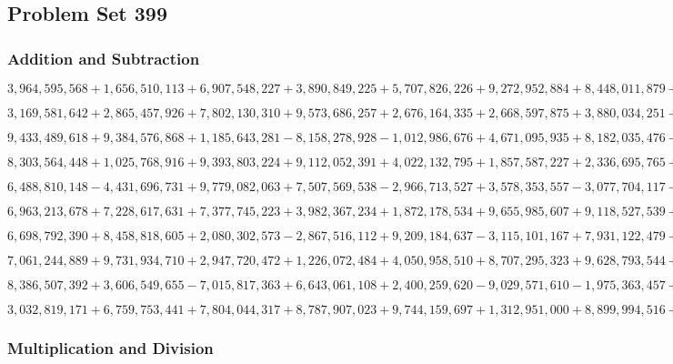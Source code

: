 \hypertarget{problem-set-399}{%
\subsection{Problem Set 399}\label{problem-set-399}}

\hypertarget{addition-and-subtraction}{%
\subsubsection{Addition and
Subtraction}\label{addition-and-subtraction}}

\(3,964,595,568+1,656,510,113+6,907,548,227+3,890,849,225+5,707,826,226+9,272,952,884+8,448,011,879+5,635,852,078+5,409,911,053+2,541,730,632\)

\(3,169,581,642+2,865,457,926+7,802,130,310+9,573,686,257+2,676,164,335+2,668,597,875+3,880,034,251+4,386,656,898+8,147,370,003+4,119,819,039\)

\(9,433,489,618+9,384,576,868+1,185,643,281-8,158,278,928-1,012,986,676+4,671,095,935+8,182,035,476-9,944,516,921-7,459,553,108+2,318,448,914\)

\(8,303,564,448+1,025,768,916+9,393,803,224+9,112,052,391+4,022,132,795+1,857,587,227+2,336,695,765+9,436,350,249+3,435,406,021+7,232,783,621\)

\(6,488,810,148-4,431,696,731+9,779,082,063+7,507,569,538-2,966,713,527+3,578,353,557-3,077,704,117-2,105,421,463+7,402,341,933+8,387,929,036\)

\(6,963,213,678+7,228,617,631+7,377,745,223+3,982,367,234+1,872,178,534+9,655,985,607+9,118,527,539+8,548,976,158+8,820,272,775+8,122,568,241\)

\(6,698,792,390+8,458,818,605+2,080,302,573-2,867,516,112+9,209,184,637-3,115,101,167+7,931,122,479+5,859,438,717-9,341,246,628-6,483,360,662\)

\(7,061,244,889+9,731,934,710+2,947,720,472+1,226,072,484+4,050,958,510+8,707,295,323+9,628,793,544+4,817,521,247+9,869,676,493+9,381,947,595\)

\(8,386,507,392+3,606,549,655-7,015,817,363+6,643,061,108+2,400,259,620-9,029,571,610-1,975,363,457+7,398,861,792+7,184,942,287-4,474,071,955\)

\(3,032,819,171+6,759,753,441+7,804,044,317+8,787,907,023+9,744,159,697+1,312,951,000+8,899,994,516+8,308,096,162+8,775,549,047+5,552,578,450\)

\hypertarget{multiplication-and-division}{%
\subsubsection{Multiplication and
Division}\label{multiplication-and-division}}

